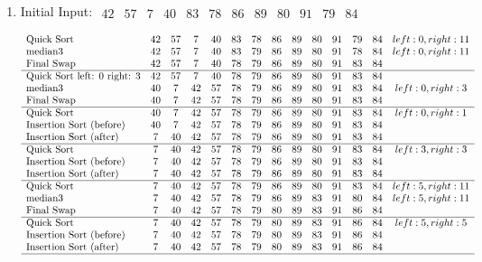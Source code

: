 \documentclass[10pt]{article}
\begin{document}
\begin{enumerate}
\pagebreak
\item Initial Input: 
$
\begin{array}{cccccccccccc}
42 & 57 & 7 & 40 & 83 & 78 & 86 & 89 & 80 & 91 & 79 & 84
\end{array}
$

\[
\begin{array}{lccccccccccccc}
$Quick Sort$ & 42 & 57 & 7 & 40 & 83 & 78 & 86 & 89 & 80 & 91 & 79 & 84 & left: 0, right: 11\\
$median3$ & 42 & 57 & 7 & 40 & 83 & 79 & 86 & 89 & 80 & 91 & 78 & 84 & left: 0, right: 11\\
$Final Swap$& 42 & 57 & 7 & 40 & 78 & 79 & 86 & 89 & 80 & 91 & 83 & 84 \\ \hline
$Quick Sort left: 0 right: 3$ & 42 & 57 & 7 & 40 & 78 & 79 & 86 & 89 & 80 & 91 & 83 & 84 \\
$median3$ & 40 & 7 & 42 & 57 & 78 & 79 & 86 & 89 & 80 & 91 & 83 & 84 & left: 0, right: 3\\
$Final Swap$& 40 & 7 & 42 & 57 & 78 & 79 & 86 & 89 & 80 & 91 & 83 & 84 \\ \hline
$Quick Sort$ & 40 & 7 & 42 & 57 & 78 & 79 & 86 & 89 & 80 & 91 & 83 & 84 & left: 0, right: 1\\
$Insertion Sort (before) $& 40 & 7 & 42 & 57 & 78 & 79 & 86 & 89 & 80 & 91 & 83 & 84 \\
$Insertion Sort (after) $& 7 & 40 & 42 & 57 & 78 & 79 & 86 & 89 & 80 & 91 & 83 & 84 \\ \hline
$Quick Sort$ & 7 & 40 & 42 & 57 & 78 & 79 & 86 & 89 & 80 & 91 & 83 & 84 & left: 3, right: 3\\
$Insertion Sort (before)$& 7 & 40 & 42 & 57 & 78 & 79 & 86 & 89 & 80 & 91 & 83 & 84 \\
$Insertion Sort (after)$& 7 & 40 & 42 & 57 & 78 & 79 & 86 & 89 & 80 & 91 & 83 & 84 \\ \hline
$Quick Sort$ & 7 & 40 & 42 & 57 & 78 & 79 & 86 & 89 & 80 & 91 & 83 & 84 & left: 5, right: 11\\
$median3$ & 7 & 40 & 42 & 57 & 78 & 79 & 86 & 89 & 83 & 91 & 80 & 84 & left: 5, right: 11\\
$Final Swap$& 7 & 40 & 42 & 57 & 78 & 79 & 80 & 89 & 83 & 91 & 86 & 84 \\ \hline
$Quick Sort$ & 7 & 40 & 42 & 57 & 78 & 79 & 80 & 89 & 83 & 91 & 86 & 84 & left: 5, right: 5\\
$Insertion Sort (before)$& 7 & 40 & 42 & 57 & 78 & 79 & 80 & 89 & 83 & 91 & 86 & 84 \\
$Insertion Sort (after)$& 7 & 40 & 42 & 57 & 78 & 79 & 80 & 89 & 83 & 91 & 86 & 84 \\ \hline

\end{array}\]
\end{enumerate}
\end{document}
